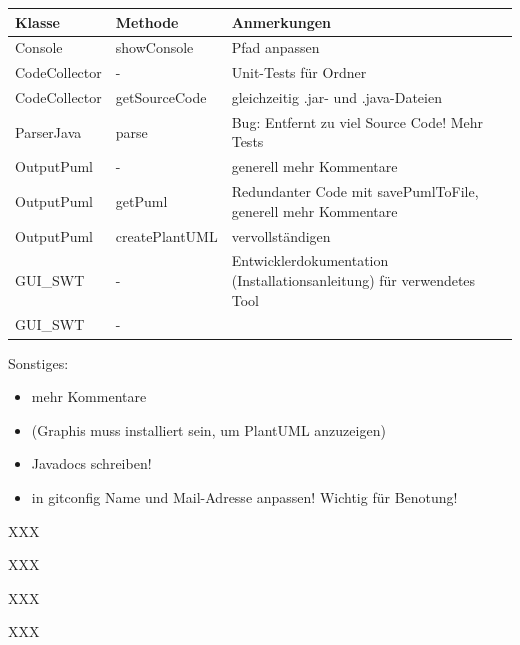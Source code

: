 \begin{table}[H]

\begin{tabularx}{\textwidth}{ |l|l|X| }
\hline
\textbf{Klasse} & \textbf{Methode} & \textbf{Anmerkungen}\\
 \hline
Console & showConsole & Pfad anpassen \\
CodeCollector & - & Unit-Tests für Ordner \\
CodeCollector & getSourceCode & gleichzeitig .jar- und .java-Dateien \\
ParserJava & parse & Bug: Entfernt zu viel Source Code! Mehr Tests\\
OutputPuml & - & generell mehr Kommentare \\
OutputPuml & getPuml & Redundanter Code mit savePumlToFile, generell mehr Kommentare\\
OutputPuml & createPlantUML & vervollständigen \\
GUI\_SWT & - & Entwicklerdokumentation (Installationsanleitung) für verwendetes Tool\\
GUI\_SWT & - &  \\ \hline
\end{tabularx}
\end{table}

Sonstiges:
\begin{itemize}
\item mehr Kommentare
\item (Graphis muss installiert sein, um PlantUML anzuzeigen)
\item Javadocs schreiben!
\item in gitconfig Name und Mail-Adresse anpassen! Wichtig für Benotung!
\end{itemize}
\nsecend

XXX
\nsecend

XXX
\nsecend

XXX
\nsecend

XXX
\nsecend

